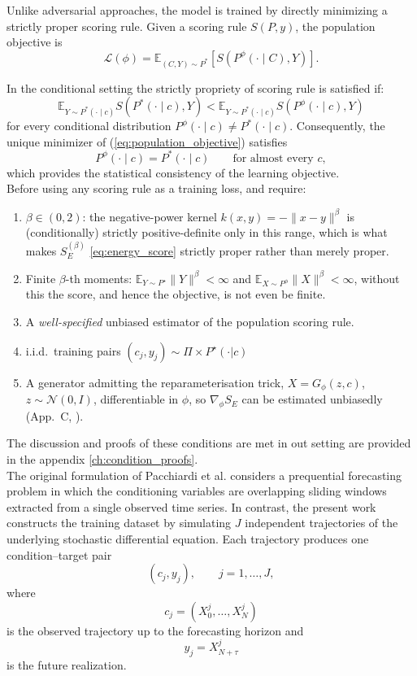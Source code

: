 Unlike adversarial approaches, the model is trained by directly minimizing a strictly proper scoring rule. Given a scoring rule $S(P,y)$, the population objective is
\begin{equation}
\label{eq:population_objective}
\mathcal{L}(\phi)
=
\mathbb{E}_{(C,Y)\sim P^*}
\left[
S\!\left(P^\phi(\cdot\mid C),Y\right)
\right].
\end{equation}

In the conditional setting the strictly propriety of scoring rule is satisfied if:
\[
\mathbb{E}_{Y\sim P^*(\cdot\mid c)}
S(P^*(\cdot\mid c),Y)
<
\mathbb{E}_{Y\sim P^*(\cdot\mid c)}
S(P^\phi(\cdot\mid c),Y)
\]
for every conditional distribution
$
P^\phi(\cdot\mid c)\neq P^*(\cdot\mid c).
$
Consequently, the unique minimizer of (\ref{eq:population_objective}) satisfies
\[
P^\phi(\cdot\mid c)=P^*(\cdot\mid c)
\qquad
\text{for almost every }c,
\]
which provides the statistical consistency of the learning objective.\\


Before using any scoring rule as a training loss, \cite{srforgan:srforgan} and \cite{background:scoring_rules} require:

\begin{enumerate}
    \label{ES_conditions}
\item $\beta\in(0,2)$: the negative-power kernel $k(x,y)=-\|x-y\|^\beta$ is (conditionally) strictly positive-definite only in this range, which is what makes $S_E^{(\beta)}$ \ref{eq:energy_score} strictly proper rather than merely proper.
\item Finite $\beta$-th moments: $\mathbb{E}_{Y\sim P^\star}\|Y\|^\beta<\infty$ and $\mathbb{E}_{X\sim P^\phi}\|X\|^\beta<\infty$, without this the score, and hence the objective, is not even be finite.
\item A \emph{well-specified} unbiased estimator of the population scoring rule.
\item i.i.d.\ training pairs $(c_j,y_j)\sim\Pi\times P^\star(\cdot|c)$ 
\item A generator admitting the reparameterisation trick, $X=G_\phi(z,c)$, $z\sim\mathcal N(0,I)$, differentiable in $\phi$, so $\nabla_\phi S_E$ can be estimated unbiasedly (App.~C, \cite{srforgan:srforgan}).
\end{enumerate}
The discussion and proofs of these conditions are met in out setting are provided in the appendix \ref{ch:condition_proofs}.\\


The original formulation of Pacchiardi et al. \cite{srforgan:srforgan} considers a prequential forecasting problem in which the conditioning variables are overlapping sliding windows extracted from a single observed time series. 
In contrast, the present work constructs the training dataset by simulating $J$ independent trajectories of the underlying stochastic differential equation. 
Each trajectory produces one condition--target pair
\[
(c_j,y_j),
\qquad
j=1,\ldots,J,
\]
where
\[
c_j
=
(X_0^j,\ldots,X_N^j)
\]
is the observed trajectory up to the forecasting horizon and
\[
y_j
=
X_{N+\tau}^j
\]
is the future realization.



